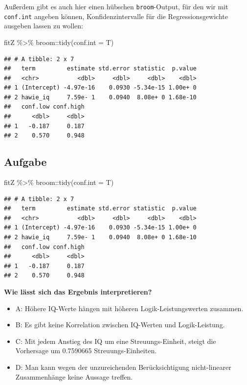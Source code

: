 \documentclass[
]{book}
\newenvironment{Shaded}{\begin{snugshade}}{\end{snugshade}}
\newcommand{\AttributeTok}[1]{\textcolor[rgb]{0.77,0.63,0.00}{#1}}
\newcommand{\FunctionTok}[1]{\textcolor[rgb]{0.00,0.00,0.00}{#1}}
\newcommand{\NormalTok}[1]{#1}
\newcommand{\SpecialCharTok}[1]{\textcolor[rgb]{0.00,0.00,0.00}{#1}}
\providecommand{\tightlist}{%
  \setlength{\itemsep}{0pt}\setlength{\parskip}{0pt}}
\begin{document}
Außerdem gibt es auch hier einen hübschen \texttt{broom}-Output, für den wir mit \texttt{conf.int} angeben können, Konfidenzintervalle für die Regressionsgewichte ausgeben lassen zu wollen:

\begin{Shaded}
\begin{Highlighting}[]
\NormalTok{fitZ }\SpecialCharTok{\%\textgreater{}\%} 
\NormalTok{  broom}\SpecialCharTok{::}\FunctionTok{tidy}\NormalTok{(}\AttributeTok{conf.int =}\NormalTok{ T)}
\end{Highlighting}
\end{Shaded}

\begin{verbatim}
## # A tibble: 2 x 7
##   term         estimate std.error statistic  p.value
##   <chr>           <dbl>     <dbl>     <dbl>    <dbl>
## 1 (Intercept) -4.97e-16    0.0930 -5.34e-15 1.00e+ 0
## 2 hawie_iq     7.59e- 1    0.0940  8.08e+ 0 1.68e-10
##   conf.low conf.high
##      <dbl>     <dbl>
## 1   -0.187     0.187
## 2    0.570     0.948
\end{verbatim}

\hypertarget{aufgabe-2}{%
\subsection{Aufgabe}\label{aufgabe-2}}

\begin{Shaded}
\begin{Highlighting}[]
\NormalTok{fitZ }\SpecialCharTok{\%\textgreater{}\%} 
\NormalTok{  broom}\SpecialCharTok{::}\FunctionTok{tidy}\NormalTok{(}\AttributeTok{conf.int =}\NormalTok{ T)}
\end{Highlighting}
\end{Shaded}

\begin{verbatim}
## # A tibble: 2 x 7
##   term         estimate std.error statistic  p.value
##   <chr>           <dbl>     <dbl>     <dbl>    <dbl>
## 1 (Intercept) -4.97e-16    0.0930 -5.34e-15 1.00e+ 0
## 2 hawie_iq     7.59e- 1    0.0940  8.08e+ 0 1.68e-10
##   conf.low conf.high
##      <dbl>     <dbl>
## 1   -0.187     0.187
## 2    0.570     0.948
\end{verbatim}

\textbf{Wie lässt sich das Ergebnis interpretieren?}

\begin{itemize}
\tightlist
\item
  A: Höhere IQ-Werte hängen mit höheren Logik-Leistungswerten zusammen.
\item
  B: Es gibt keine Korrelation zwischen IQ-Werten und Logik-Leistung.
\item
  C: Mit jedem Anstieg des IQ um eine Streuungs-Einheit, steigt die Vorhersage um 0.7590665 Streuungs-Einheiten.
\item
  D: Man kann wegen der unzureichenden Berücksichtigung nicht-linearer Zusammenhänge keine Aussage treffen.
\end{itemize}
\end{document}
